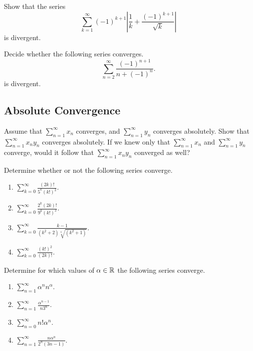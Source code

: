 \documentclass[10pt, a4paper]{article}
\newcommand{\infsum}[1][n = 1]{\sum_{#1}^{\infty}}
\begin{document}
\begin{example}
    Show that the series
    \[
    \sum_{k = 1}^{\infty} (-1)^{k + 1} \left|\frac{1}{k} + \frac{(-1) ^ {k + 1}}{\sqrt{k}}\right|
    \]
    is divergent.
\end{example}

\begin{example}
    Decide whether the following series converges.
    \[
    \sum_{n = 2}^{\infty} \frac{(-1)^{n + 1}}{n + (-1) ^ n}.
    \]
    is divergent.
\end{example}

\subsection{Absolute Convergence}

\begin{example}
    Assume that $\infsum x_n$ converges, and $\infsum y_n$ converges absolutely. Show that $\infsum x_ny_n$ converges absolutely. If we knew only that $\infsum x_n$ and $\infsum y_n$ converge, would it follow that $\infsum x_ny_n$ converged as well?
\end{example}

\begin{example}
    Determine whether or not the following series converge.
    \begin{enumerate}[label = \alph*.]
        \item $\displaystyle \infsum[k = 0]\frac{(2k)!}{5 ^ k (k!) ^ 2}.$
        \item $\displaystyle \infsum[k = 0]\frac{2 ^ k (2k)!}{9 ^ k (k!) ^ 2}.$
        \item $\displaystyle \infsum[k = 0]\frac{k - 1}{(k ^ 2 + 2)\sqrt[4]{(k ^ 2 + 1)}}.$
        \item $\displaystyle \infsum[k = 0]\frac{(k!) ^ 2}{(2k)!}.$
    \end{enumerate}
\end{example}

\begin{example}
    Determine for which values of $\alpha \in \mathbb{R}$ the following series converge.
    \begin{enumerate}[label = \alph*.]
        \item $\displaystyle \infsum\alpha ^ n n ^ \alpha.$
        \item $\displaystyle \infsum\frac{\alpha ^ {n - 1}}{n 3 ^ n}.$
        \item $\displaystyle \infsum[n = 0] n! \alpha ^ n.$
        \item $\displaystyle \infsum\frac{n \alpha ^ n}{2 ^ n (3n - 1)}.$
    \end{enumerate}
\end{example}
\end{document}
